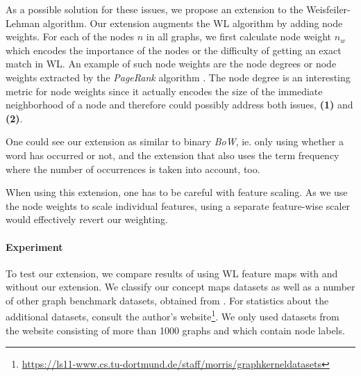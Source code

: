 As a possible solution for these issues, we propose an extension to the Weisfeiler-Lehman algorithm.
Our extension augments the WL algorithm by adding node weights.
For each of the nodes $n$ in all graphs, we first calculate node weight $n_w$ which encodes the importance of the nodes or the difficulty of getting an exact match in WL.
An example of such node weights are the node degrees or node weights extracted by the \textit{PageRank} algorithm \cite{Page1998}.
The node degree is an interesting metric for node weights since it actually encodes the size of the immediate neighborhood of a node and therefore could possibly address both issues, \textbf{(1)} and \textbf{(2)}.

One could see our extension as similar to binary \textit{BoW}, ie. only using whether a word has occurred or not, and the extension that also uses the term frequency where the number of occurrences is taken into account, too.

When using this extension, one has to be careful with feature scaling. As we use the node weights to scale individual features, using a separate feature-wise scaler would effectively revert our weighting.

\paragraph{Experiment}
To test our extension, we compare results of using WL feature maps with and without our extension.
We classify our concept maps datasets as well as a number of other graph benchmark datasets, obtained from \cite{Kersting2016}.
For statistics about the additional datasets, consult the author's website\footnote{\url{https://ls11-www.cs.tu-dortmund.de/staff/morris/graphkerneldatasets}}.
We only used datasets from the website consisting of more than 1000 graphs and which contain node labels.

